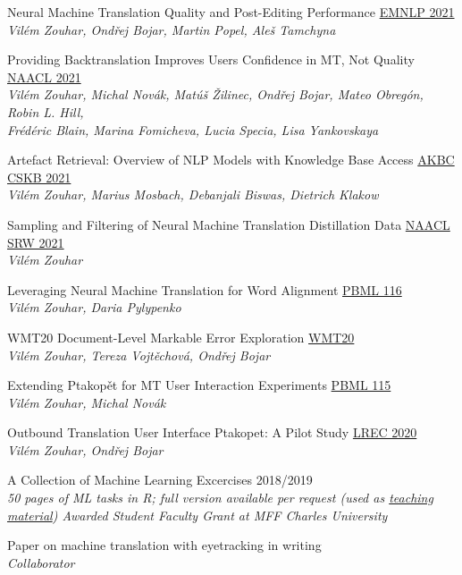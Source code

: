 \documentclass[11pt,a4paper]{article} %
\newcommand{\hSubsectionB}[3]{
    {#1} \hfill {\footnotesize #2}\hspace{-1cm}\\
    \vspace{-0.2cm} \hspace{-0.17cm}\textit{\footnotesize #3}
    \vspace{0.05cm}
}
\begin{document}
\hSubsectionB
{Neural Machine Translation Quality and Post-Editing Performance}
{\href{https://arxiv.org/pdf/2109.05016.pdf}{EMNLP 2021}}
{Vilém Zouhar, Ondřej Bojar, Martin Popel, Aleš Tamchyna}

\hSubsectionB
{Providing Backtranslation Improves Users Confidence in MT, Not Quality}
{\href{https://aclanthology.org/2021.naacl-main.14/}{NAACL 2021}}
{Vilém Zouhar, Michal Novák, Matúš Žilinec, Ondřej Bojar, Mateo Obregón, Robin L. Hill,\\ Frédéric Blain, Marina Fomicheva, Lucia Specia, Lisa Yankovskaya}
\vspace{-0.11cm}

\hSubsectionB
{Artefact Retrieval: Overview of NLP Models with Knowledge Base Access}
{\href{https://openreview.net/forum?id=9_oCNR6R9l2}{AKBC CSKB 2021}}
{Vilém Zouhar, Marius Mosbach, Debanjali Biswas, Dietrich Klakow}

\hSubsectionB
{Sampling and Filtering of Neural Machine Translation Distillation Data}
{\href{https://aclanthology.org/2021.naacl-srw.1/}{NAACL SRW 2021}}
{Vilém Zouhar}

\hSubsectionB
{Leveraging Neural Machine Translation for Word Alignment}
{\href{https://ufal.mff.cuni.cz/pbml/116/art-zouhar-pylypenko.pdf}{PBML 116}}
{Vilém Zouhar, Daria Pylypenko}

\hSubsectionB
{WMT20 Document-Level Markable Error Exploration}
{\href{https://aclanthology.org/2020.wmt-1.41/}{WMT20}}
{Vilém Zouhar, Tereza Vojtěchová, Ondřej Bojar}

\hSubsectionB
{Extending Ptakopět for MT User Interaction Experiments}
{\href{https://ufal.mff.cuni.cz/pbml/115/art-zouhar-novak.pdf}{PBML 115}}
{Vilém Zouhar, Michal Novák}

\hSubsectionB
{Outbound Translation User Interface Ptakopet: A Pilot Study}
{\href{https://aclanthology.org/2020.lrec-1.860/}{LREC 2020}}
{Vilém Zouhar, Ondřej Bojar}

\hSubsectionB
{A Collection of Machine Learning Excercises}
{2018/2019}
{
\hspace{-0.1cm}50 pages of ML tasks in R; full version available per request (used as \href{http://ufal.mff.cuni.cz/courses/npfl054}{teaching material}) \vspace{0.1cm}\newline
\vspace{-0.2cm}\hspace{-0.01cm}Awarded Student Faculty Grant at MFF Charles University
}

\hSubsectionB
{Paper on machine translation with eyetracking}
{in writing}
{Collaborator}
\end{document}
